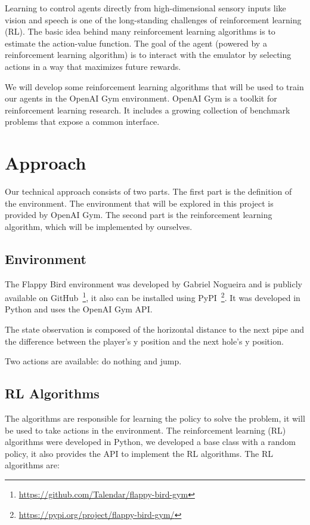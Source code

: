 \documentclass[letterpaper]{article}
\begin{document}
Learning to control agents directly from high-dimensional sensory inputs like vision and speech is
one of the long-standing challenges of reinforcement learning (RL). The basic idea behind many reinforcement learning algorithms is to estimate the action-value function. The goal of the agent (powered by a reinforcement learning algorithm) is to interact with the emulator by selecting actions in a way that maximizes future rewards.\cite{mnih2013playing}

We will develop some reinforcement learning algorithms that will be used to train our agents in the OpenAI Gym environment. OpenAI Gym is a toolkit for reinforcement learning research. It includes a growing collection of benchmark problems that expose a common interface.\cite{brockman2016openai}

\section{Approach}

Our technical approach consists of two parts. The first part is the definition of the environment. The environment that will be explored in this project is provided by OpenAI Gym. The second part is the reinforcement learning algorithm, which will be implemented by ourselves.

\subsection{Environment}
The Flappy Bird environment was developed by Gabriel Nogueira and is publicly available on GitHub~\footnote{\url{https://github.com/Talendar/flappy-bird-gym}}, it also can be installed using PyPI~\footnote{\url{https://pypi.org/project/flappy-bird-gym/}}. It was developed in Python and uses the OpenAI Gym API.

The state observation is composed of the horizontal distance to the next pipe and the difference between the player's y position and the next hole's y position.

Two actions are available: do nothing and jump.

\subsection{RL Algorithms}

The algorithms are responsible for learning the policy to solve the problem, it will be used to take actions in the environment. The reinforcement learning (RL) algorithms were developed in Python, we developed a base class with a random policy, it also provides the API to implement the RL algorithms. The RL algorithms are:
\end{document}
